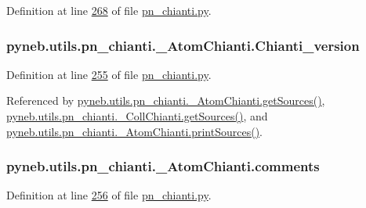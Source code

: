 Definition at line \hyperlink{pn__chianti_8py_source_l00268}{268} of file \hyperlink{pn__chianti_8py_source}{pn\-\_\-chianti.\-py}.

\hypertarget{classpyneb_1_1utils_1_1pn__chianti_1_1___atom_chianti_a56253efc79815d86493f5753ff9c5b72}{
\subsubsection[{Chianti\-\_\-version}]{\setlength{\rightskip}{0pt plus 5cm}pyneb.\-utils.\-pn\-\_\-chianti.\-\_\-\-Atom\-Chianti.\-Chianti\-\_\-version}}\label{classpyneb_1_1utils_1_1pn__chianti_1_1___atom_chianti_a56253efc79815d86493f5753ff9c5b72}


Definition at line \hyperlink{pn__chianti_8py_source_l00255}{255} of file \hyperlink{pn__chianti_8py_source}{pn\-\_\-chianti.\-py}.



Referenced by \hyperlink{pn__chianti_8py_source_l00393}{pyneb.\-utils.\-pn\-\_\-chianti.\-\_\-\-Atom\-Chianti.\-get\-Sources()}, \hyperlink{pn__chianti_8py_source_l00570}{pyneb.\-utils.\-pn\-\_\-chianti.\-\_\-\-Coll\-Chianti.\-get\-Sources()}, and \hyperlink{pn__chianti_8py_source_l00404}{pyneb.\-utils.\-pn\-\_\-chianti.\-\_\-\-Atom\-Chianti.\-print\-Sources()}.

\hypertarget{classpyneb_1_1utils_1_1pn__chianti_1_1___atom_chianti_afebb1605835d41af3a3078038475913a}{
\subsubsection[{comments}]{\setlength{\rightskip}{0pt plus 5cm}pyneb.\-utils.\-pn\-\_\-chianti.\-\_\-\-Atom\-Chianti.\-comments}}\label{classpyneb_1_1utils_1_1pn__chianti_1_1___atom_chianti_afebb1605835d41af3a3078038475913a}


Definition at line \hyperlink{pn__chianti_8py_source_l00256}{256} of file \hyperlink{pn__chianti_8py_source}{pn\-\_\-chianti.\-py}.

